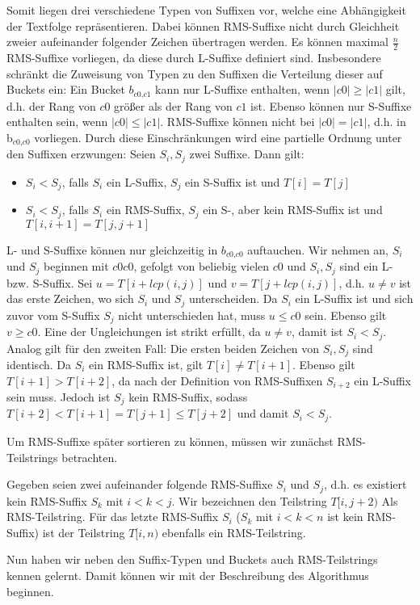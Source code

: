 Somit liegen drei verschiedene Typen von Suffixen vor, welche eine Abhängigkeit der Textfolge repräsentieren. Dabei können RMS-Suffixe nicht durch Gleichheit zweier aufeinander folgender Zeichen übertragen werden. Es können maximal $\frac{n}{2}$ RMS-Suffixe vorliegen, da diese durch L-Suffixe definiert sind. Insbesondere schränkt die Zuweisung von Typen zu den Suffixen die Verteilung dieser auf Buckets ein: Ein Bucket $b_{\textit{c0,c1}}$ kann nur L-Suffixe enthalten, wenn $|c0| \geq |c1|$ gilt, d.h. der Rang von $c0$ größer als der Rang von $c1$ ist. Ebenso können nur S-Suffixe enthalten sein, wenn $|c0| \leq |c1|$. RMS-Suffixe können nicht bei $|c0|=|c1|$, d.h. in b$_{\textit{c0,c0}}$ vorliegen.
Durch diese Einschränkungen wird eine partielle Ordnung unter den Suffixen erzwungen:
	Seien $S_i, S_j$ zwei Suffixe. Dann gilt:
	\begin{itemize}
		\item $S_i < S_j$, falls $S_i$ ein L-Suffix, $S_j$ ein S-Suffix ist und $T[i] = T[j]$
		\item $S_i < S_j$, falls $S_i$ ein RMS-Suffix, $S_j$ ein S-, aber kein RMS-Suffix ist und $T[i, i+1] = T[j, j+1]$
	\end{itemize}

	L- und S-Suffixe können nur gleichzeitig in $b_{\textit{c0,c0}}$ auftauchen. Wir nehmen an, $S_i$ und $S_j$ beginnen mit $c0c0$, gefolgt von beliebig vielen $c0$ und $S_i, S_j$ sind ein L- bzw. S-Suffix. Sei $u = T[i+lcp(i, j)]$ und $v = T[j+lcp(i, j)]$, d.h. $u \neq v$ ist das erste Zeichen, wo sich $S_i$ und $S_j$ unterscheiden. Da $S_i$ ein L-Suffix ist und sich zuvor vom S-Suffix $S_j$ nicht unterschieden hat, muss $u \leq c0$ sein. Ebenso gilt $v \geq c0$. Eine der Ungleichungen ist strikt erfüllt, da $u \neq v$, damit ist $S_i < S_j$.
	Analog gilt für den zweiten Fall: Die ersten beiden Zeichen von $S_i, S_j$ sind identisch. Da $S_i$ ein RMS-Suffix ist, gilt $T[i] \neq T[i+1]$. Ebenso gilt $T[i+1] > T[i+2]$, da nach der Definition von RMS-Suffixen $S_{i+2}$ ein L-Suffix sein muss. Jedoch ist $S_j$ kein RMS-Suffix, sodass $T[i+2] < T[i+1] =  T[j+1] \leq T[j+2]$ und damit $S_i < S_j$. 

Um RMS-Suffixe später sortieren zu können, müssen wir zunächst RMS-Teilstrings betrachten.

\begin{definition}
	Gegeben seien zwei aufeinander folgende RMS-Suffixe $S_i$ und $S_j$, d.h. es existiert kein RMS-Suffix $S_k$ mit $i < k < j$. Wir bezeichnen den Teilstring $T[i, j+2)$ Als RMS-Teilstring. Für das letzte RMS-Suffix $S_i$ ($S_k$ mit $ i < k < n$ ist kein RMS-Suffix) ist der Teilstring $T[i, n)$ ebenfalls ein RMS-Teilstring.
\end{definition}

Nun haben wir neben den Suffix-Typen und Buckets auch RMS-Teilstrings kennen gelernt. Damit können wir mit der Beschreibung des Algorithmus beginnen.
